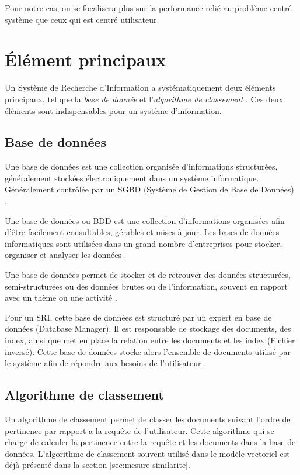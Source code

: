 Pour notre cas, on se focalisera plus sur la performance relié au problème centré système que ceux qui est centré utilisateur.

\section{Élément principaux}
Un Système de Recherche d'Information a systématiquement deux éléments principaux, tel que la \textit{base de donnée} et l'\textit{algorithme de classement} \citep{approche-semantique}. Ces deux éléments sont indispensables pour un système d'information.

\subsection{Base de données}
\begin{definition}
	Une base de données est une collection organisée d’informations structurées, généralement stockées
	électroniquement dans un système informatique. Généralement contrôlée par un SGBD (Système de Gestion de Base de Données) \citep{oracle-database}.
\end{definition}

\begin{definition}
	Une base de données ou BDD est une collection d’informations organisées afin d’être facilement consultables, gérables et mises à jour. Les bases de données informatiques sont utilisées dans un grand nombre d’entreprises pour stocker, organiser et analyser les données \citep{lebigdata}.
\end{definition}

\begin{definition}
	Une base de données permet de stocker et de retrouver des données structurées, semi-structurées ou des données brutes ou de l'information, souvent en rapport avec un thème ou une activité \citep{wiki-database}.
\end{definition}

Pour un SRI, cette base de données est structuré par un expert en base de données (Database Manager). Il est responsable de stockage des documents, des index, ainsi que met en place la relation entre les documents et les index (Fichier inversé). Cette base de données stocke alors l'ensemble de documents utilisé par le système afin de répondre aux besoins de l'utilisateur \citep{vsm-for-arabic-language}.

\subsection{Algorithme de classement}
Un algorithme de classement permet de classer les documents suivant l'ordre de pertinence par rapport a la requête de l'utilisateur. Cette algorithme qui se charge de calculer la pertinence entre la requête et les documents dans la base de données. L'algorithme de classement souvent utilisé dans le modèle vectoriel est déjà présenté dans la section \ref{sec:mesure-similarite}.


